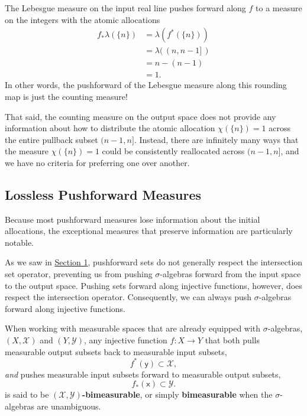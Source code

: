 \documentclass[
  letterpaper,
  DIV=11,
  numbers=noendperiod]{scrartcl}
\begin{document}
The Lebesgue measure on the input real line pushes forward along \(f\)
to a measure on the integers with the atomic allocations \begin{align*}
f_{*} \lambda( \{ n \} )
&=
\lambda( f^{*} ( \{ n \} ) )
\\
&=
\lambda( \, (n, n - 1] \, )
\\
&=
n - (n - 1)
\\
&=
1.
\end{align*} In other words, the pushforward of the Lebesgue measure
along this rounding map is just the counting measure!

That said, the counting measure on the output space does not provide any
information about how to distribute the atomic allocation
\(\chi( \{ n \} ) = 1\) across the entire pullback subset
\((n - 1, n]\). Instead, there are infinitely many ways that the measure
\(\chi( \{ n \} ) = 1\) could be consistently reallocated across
\((n - 1, n]\), and we have no criteria for preferring one over another.

\subsection{Lossless Pushforward
Measures}\label{lossless-pushforward-measures}

Because most pushforward measures lose information about the initial
allocations, the exceptional measures that preserve information are
particularly notable.

As we saw in \hyperref[sec:pushforward-sets]{Section 1}, pushforward
sets do not generally respect the intersection set operator, preventing
us from pushing \(\sigma\)-algebras forward from the input space to the
output space. Pushing sets forward along injective functions, however,
does respect the intersection operator. Consequently, we can always push
\(\sigma\)-algebras forward along injective functions.

When working with measurable spaces that are already equipped with
\(\sigma\)-algebras, \((X, \mathcal{X})\) and \((Y, \mathcal{Y})\), any
injective function \(f : X \rightarrow Y\) that both pulls measurable
output subsets back to measurable input subsets, \[
f^{*}(\mathsf{y}) \subset \mathcal{X},
\] \emph{and} pushes measurable input subsets forward to measurable
output subsets, \[
f_{*}(\mathsf{x}) \subset \mathcal{Y}.
\] is said to be \textbf{\(( \mathcal{X}, \mathcal{Y} )\)-bimeasurable},
or simply \textbf{bimeasurable} when the \(\sigma\)-algebras are
unambiguous.
\end{document}
